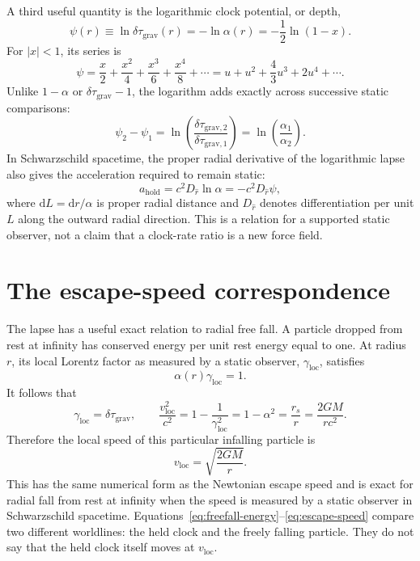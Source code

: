 \documentclass[12pt]{article}
\begin{document}
A third useful quantity is the logarithmic clock potential, or depth,
\begin{equation}
  \psi(r)\equiv\ln \delta\tau_{\mathrm{grav}}(r)=-\ln\alpha(r)
  =-\frac{1}{2}\ln(1-x).
  \label{eq:log-depth}
\end{equation}
For $|x|<1$, its series is
\begin{equation}
  \psi
  =\frac{x}{2}+\frac{x^2}{4}+\frac{x^3}{6}+\frac{x^4}{8}+\cdots
  =u+u^2+\frac{4}{3}u^3+2u^4+\cdots.
  \label{eq:log-depth-series}
\end{equation}
Unlike $1-\alpha$ or $\delta\tau_{\mathrm{grav}}-1$, the logarithm adds exactly across successive static comparisons:
\begin{equation}
  \psi_2-\psi_1
  =\ln\!\left(\frac{\delta\tau_{\mathrm{grav},2}}{\delta\tau_{\mathrm{grav},1}}\right)
  =\ln\!\left(\frac{\alpha_1}{\alpha_2}\right).
  \label{eq:additive-log}
\end{equation}
In Schwarzschild spacetime, the proper radial derivative of the logarithmic lapse also gives the acceleration required to remain static:
\begin{equation}
  a_{\mathrm{hold}}
  =c^2 D_{\hat r}\ln\alpha
  =-c^2D_{\hat r}\psi,
  \label{eq:log-gradient-acceleration}
\end{equation}
where $\mathrm{d}L=\mathrm{d}r/\alpha$ is proper radial distance and $D_{\hat r}$ denotes differentiation per unit $L$ along the outward radial direction. This is a relation for a supported static observer, not a claim that a clock-rate ratio is a new force field.

\section{The escape-speed correspondence}

The lapse has a useful exact relation to radial free fall. A particle dropped from rest at infinity has conserved energy per unit rest energy equal to one. At radius $r$, its local Lorentz factor as measured by a static observer, $\gamma_{\mathrm{loc}}$, satisfies \cite{TaylorWheeler}
\begin{equation}
  \alpha(r)\gamma_{\mathrm{loc}}=1.
  \label{eq:freefall-energy}
\end{equation}
It follows that
\begin{equation}
  \gamma_{\mathrm{loc}}=\delta\tau_{\mathrm{grav}},
  \qquad
  \frac{v_{\mathrm{loc}}^2}{c^2}
  =1-\frac{1}{\gamma_{\mathrm{loc}}^2}
  =1-\alpha^2
  =\frac{r_s}{r}
  =\frac{2GM}{rc^2}.
  \label{eq:freefall-speed}
\end{equation}
Therefore the local speed of this particular infalling particle is
\begin{equation}
  v_{\mathrm{loc}}=\sqrt{\frac{2GM}{r}}.
  \label{eq:escape-speed}
\end{equation}
This has the same numerical form as the Newtonian escape speed and is exact for radial fall from rest at infinity when the speed is measured by a static observer in Schwarzschild spacetime. Equations~\eqref{eq:freefall-energy}--\eqref{eq:escape-speed} compare two different worldlines: the held clock and the freely falling particle. They do not say that the held clock itself moves at $v_{\mathrm{loc}}$.
\end{document}
